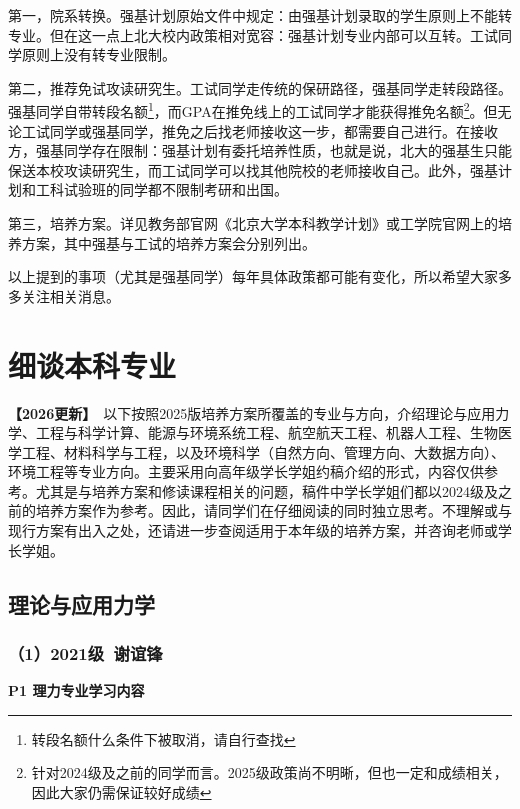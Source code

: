 \documentclass[11pt,oneside]{book}
\newcommand{\updateMark}{\textcolor{chaph}{\textbf{【2026更新】}}\ }
\begin{document}
\vspace{10pt}

第一，院系转换。强基计划原始文件中规定：由强基计划录取的学生原则上不能转专业。但在这一点上北大校内政策相对宽容：强基计划专业内部可以互转。工试同学原则上没有转专业限制。

\vspace{10pt}

第二，推荐免试攻读研究生。工试同学走传统的保研路径，强基同学走转段路径。强基同学自带转段名额\footnote{转段名额什么条件下被取消，请自行查找}，而GPA在推免线上的工试同学才能获得推免名额\footnote{针对2024级及之前的同学而言。2025级政策尚不明晰，但也一定和成绩相关，因此大家仍需保证较好成绩}。但无论工试同学或强基同学，推免之后找老师接收这一步，都需要自己进行。在接收方，强基同学存在限制：强基计划有委托培养性质，也就是说，北大的强基生只能保送本校攻读研究生，而工试同学可以找其他院校的老师接收自己。此外，强基计划和工科试验班的同学都不限制考研和出国。

\vspace{10pt}

第三，培养方案。详见教务部官网《北京大学本科教学计划》或工学院官网上的培养方案，其中强基与工试的培养方案会分别列出。

\vspace{10pt}

以上提到的事项（尤其是强基同学）每年具体政策都可能有变化，所以希望大家多多关注相关消息。

\section{细谈本科专业}
\updateMark 以下按照2025版培养方案所覆盖的专业与方向，介绍理论与应用力学、工程与科学计算、能源与环境系统工程、航空航天工程、机器人工程、生物医学工程、材料科学与工程，以及环境科学（自然方向、管理方向、大数据方向）、环境工程等专业方向。主要采用向高年级学长学姐约稿介绍的形式，内容仅供参考。尤其是与培养方案和修读课程相关的问题，稿件中学长学姐们都以2024级及之前的培养方案作为参考。因此，请同学们在仔细阅读的同时独立思考。不理解或与现行方案有出入之处，还请进一步查阅适用于本年级的培养方案，并咨询老师或学长学姐。
\subsection{理论与应用力学}
\subsubsection{（1）2021级\ 谢谊锋}
\textbf{P1 理力专业学习内容}
\end{document}
